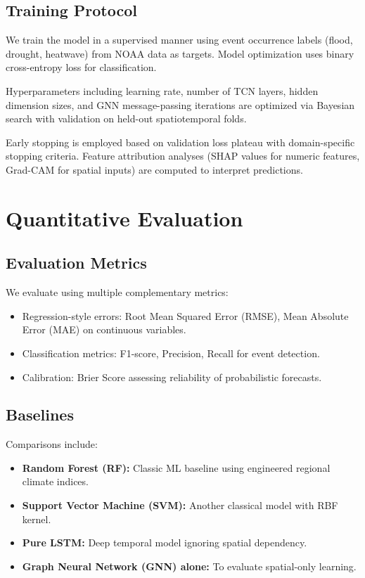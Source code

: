 \subsection{Training Protocol}

We train the model in a supervised manner using event occurrence labels (flood, drought, heatwave) from NOAA data as targets. Model optimization uses binary cross-entropy loss for classification.

Hyperparameters including learning rate, number of TCN layers, hidden dimension sizes, and GNN message-passing iterations are optimized via Bayesian search with validation on held-out spatiotemporal folds.

Early stopping is employed based on validation loss plateau with domain-specific stopping criteria. Feature attribution analyses (SHAP values for numeric features, Grad-CAM for spatial inputs) are computed to interpret predictions.

\section{Quantitative Evaluation}

\subsection{Evaluation Metrics}

We evaluate using multiple complementary metrics:

\begin{itemize}
  \item Regression-style errors: Root Mean Squared Error (RMSE), Mean Absolute Error (MAE) on continuous variables.
  \item Classification metrics: F1-score, Precision, Recall for event detection.
  \item Calibration: Brier Score assessing reliability of probabilistic forecasts.
\end{itemize}

\subsection{Baselines}

Comparisons include:

\begin{itemize}
    \item \textbf{Random Forest (RF):} Classic ML baseline using engineered regional climate indices.
    \item \textbf{Support Vector Machine (SVM):} Another classical model with RBF kernel.
    \item \textbf{Pure LSTM:} Deep temporal model ignoring spatial dependency.
    \item \textbf{Graph Neural Network (GNN) alone:} To evaluate spatial-only learning.
\end{itemize}

